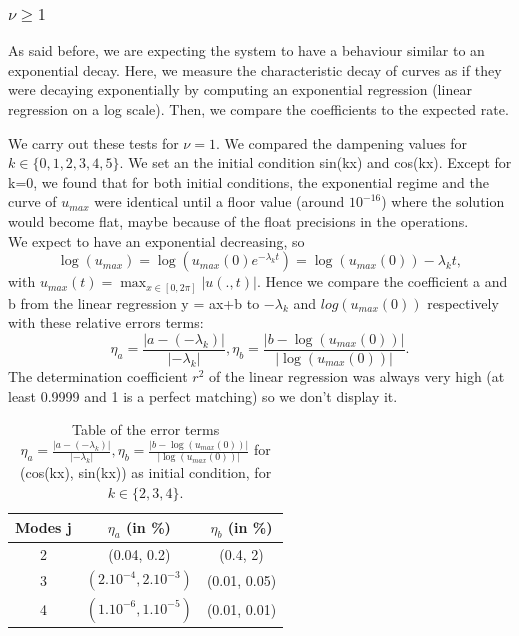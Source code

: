 \documentclass[12pt]{article}
\begin{document}
\subsubsection{\texorpdfstring{$\nu \geq 1$}{nu >= 1}}

As said before, we are expecting the system to have a behaviour similar to an exponential decay. Here, we measure the characteristic 
decay of curves as if they were decaying exponentially by computing an exponential regression (linear regression on a log scale). Then,
 we compare the coefficients to the expected rate. 

We carry out these tests for $\nu =1$. We compared the dampening values for $k \in \{0, 1, 2, 3, 4, 5\}.$ We set an the initial condition 
sin(kx) and cos(kx). Except for k=0, we found that for both initial conditions, the exponential regime and the curve of $u_{max}$ were identical 
until a floor value (around $10^{-16}$) where the solution would become flat, maybe because of the float precisions in the operations.
\\

We expect to have an exponential decreasing, so  $$\log(u_{max}) = \log(u_{max}(0)e^{-\lambda_k t}) = \log(u_{max}(0)) -  \lambda_k t,$$
 with $u_{max}(t) = \max_{x\in[0,2\pi]}|u(.,t)|.$ Hence we compare the coefficient a and b from the linear regression y = ax+b to $-\lambda_k$ 
 and $log(u_{max}(0))$ respectively with these relative errors terms: 
 $$\eta_a = \frac{|a-(-\lambda_k)|}{|-\lambda_k|}, \eta_b = \frac{|b-\log(u_{max}(0))|}{|\log(u_{max}(0))|}.$$  The determination coefficient $r^2$ of
 the linear regression was always very high (at least 0.9999 and 1 is a perfect matching) so we don't display it. 

\begin{table}
\centering
\begin{tabular}{ |c|c|c| } 
 \hline
    Modes j  & $\eta_a$ (in \%) & $\eta_b$ (in \%)  \\
 \hline
 2 & (0.04, 0.2) & (0.4, 2) \\ 
 3 & $(2.10^{-4}, 2.10^{-3})$ & (0.01, 0.05) \\ 
 4 & $(1.10^{-6}, 1.10^{-5})$ & (0.01, 0.01) \\ 
 \hline
\end{tabular}
\caption{Table of the error terms $\eta_a = \frac{|a-(-\lambda_k)|}{|-\lambda_k|}, \eta_b = \frac{|b-\log(u_{max}(0))|}{|\log(u_{max}(0))|}$ for 
(cos(kx), sin(kx)) as initial condition, for $k \in \{2, 3, 4\}$.}
\end{table}
\end{document}
